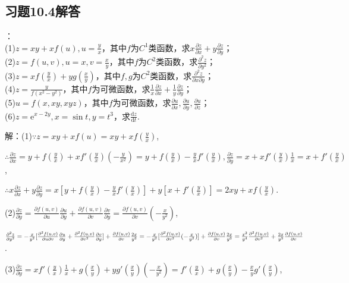 \documentclass[12pt,UTF8]{ctexart}
\begin{document}
\subsection{习题10.4解答}
\begin{enumerate}
：\\
(1)$z=xy+xf(u),u=\frac yx$，其中$f$为$C^1$类函数，求$x\frac{\partial z}{\partial x}+y\frac{\partial z}{\partial y}$；\\
(2)$z=f(u,v),u=x,v=\frac xy$，其中$f$为$C^2$类函数，求$\frac{\partial^2z}{\partial y^2}$；\\
(3)$z=xf(\frac yx)+yg(\frac xy)$，其中$f,g$为$C^2$类函数，求$\frac{\partial^2z}{\partial x\partial y}$；\\
(4)$z=\frac y{f(x^2-y^2)}$，其中$f$为可微函数，求$\frac1x\frac{\partial z}{\partial x}+\frac1y\frac{\partial z}{\partial y}$；\\
(5)$u=f(x,xy,xyz)$，其中$f$为可微函数，求$\frac{\partial u}{\partial x},\frac{\partial u}{\partial y},\frac{\partial u}{\partial z}$；\\
(6)$z=\mathrm e^{x-2y},x=\sin t,y=t^3$，求$\frac{\mathrm dz}{\mathrm dt}$.

解：(1)$\because z=xy+xf(u)=xy+xf(\frac yx)$,

$\therefore\frac{\partial z}{\partial x}=y+f(\frac yx)+xf'(\frac yx)(-\frac y{x^2})=y+f(\frac yx)-\frac yxf'(\frac yx),\frac{\partial z}{\partial y}=x+xf'(\frac yx)\frac1x=x+f'(\frac yx)$,

$\therefore x\frac{\partial z}{\partial x}+y\frac{\partial z}{\partial y}=x[y+f(\frac yx)-\frac yxf'(\frac yx)]+y[x+f'(\frac yx)]=2xy+xf(\frac yx)$.

(2)$\frac{\partial z}{\partial y}=\frac{\partial f(u,v)}{\partial u}\frac{\partial u}{\partial y}+\frac{\partial f(u,v)}{\partial v}\frac{\partial v}{\partial y}=\frac{\partial f(u,v)}{\partial v}(-\frac x{y^2})$,

$\frac{\partial^2z}{\partial y^2}=-\frac x{y^2}[\frac{\partial^2f(u,v)}{\partial u\partial v}\frac{\partial u}{\partial y}+\frac{\partial^2f(u,v)}{\partial v^2}\frac{\partial v}{\partial y}]+\frac{\partial f(u,v)}{\partial v}\frac{2x}{y^3}=-\frac x{y^2}[\frac{\partial^2f(u,v)}{\partial v^2}(-\frac x{y^2})]+\frac{\partial f(u,v)}{\partial v}\frac{2x}{y^3}\\
=\frac{x^2}{y^4}\frac{\partial^2f(u,v)}{\partial v^2}+\frac{2x}{y^3}\frac{\partial f(u,v)}{\partial v}$.

(3)$\frac{\partial z}{\partial y}=xf'(\frac yx)\frac1x+g(\frac xy)+yg'(\frac xy)(-\frac x{y^2})=f'(\frac yx)+g(\frac xy)-\frac xyg'(\frac xy)$,


\end{enumerate}
\end{document}

